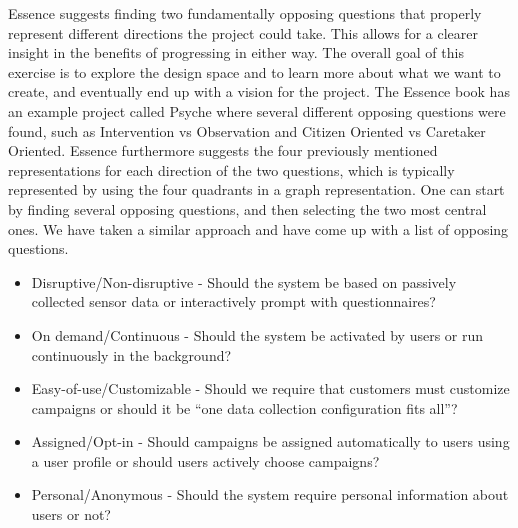 Essence suggests finding two fundamentally opposing questions that properly represent different directions the project could take. This allows for a clearer insight in the benefits of progressing in either way. The overall goal of this exercise is to explore the design space and to learn more about what we want to create, and eventually end up with a vision for the project. The Essence book has an example project called Psyche where several different opposing questions were found, such as Intervention vs Observation and Citizen Oriented vs Caretaker Oriented. Essence furthermore suggests the four previously mentioned representations for each direction of the two questions, which is typically represented by using the four quadrants in a graph representation. One can start by finding several opposing questions, and then selecting the two most central ones. We have taken a similar approach and have come up with a list of opposing questions.

\begin{itemize}[itemsep=0.1em]
	\item Disruptive/Non-disruptive - Should the system be based on passively collected sensor data or interactively prompt with questionnaires? %
	\item On demand/Continuous - Should the system be activated by users or run continuously in the background? %
	\item Easy-of-use/Customizable - Should we require that customers must customize campaigns or should it be ``one data collection configuration fits all''? %
	\item Assigned/Opt-in - Should campaigns be assigned automatically to users using a user profile or should users actively choose campaigns? %
	\item Personal/Anonymous - Should the system require personal information about users or not? %
\end{itemize}

